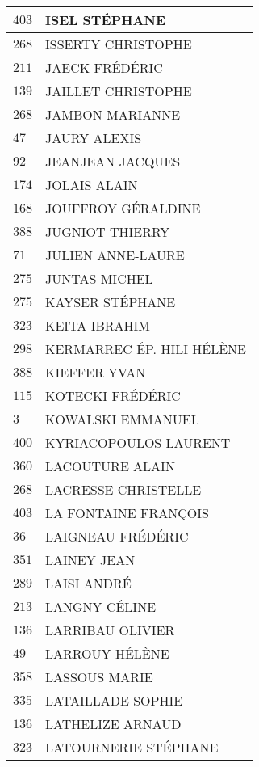 \begin{xltabular}{\linewidth}{|l|X|}
    \hline
    $403$ & ISEL STÉPHANE \\
    \hline
    $268$ & ISSERTY CHRISTOPHE \\
    \hline
    $211$ & JAECK FRÉDÉRIC \\
    \hline
    $139$ & JAILLET CHRISTOPHE \\
    \hline
    $268$ & JAMBON MARIANNE \\
    \hline
    $47$ & JAURY ALEXIS \\
    \hline
    $92$ & JEANJEAN JACQUES \\
    \hline
    $174$ & JOLAIS ALAIN \\
    \hline
    $168$ & JOUFFROY GÉRALDINE \\
    \hline
    $388$ & JUGNIOT THIERRY \\
    \hline
    $71$ & JULIEN ANNE-LAURE \\
    \hline
    $275$ & JUNTAS MICHEL \\
    \hline
    $275$ & KAYSER STÉPHANE \\
    \hline
    $323$ & KEITA IBRAHIM \\
    \hline
    $298$ & KERMARREC ÉP. HILI HÉLÈNE \\
    \hline
    $388$ & KIEFFER YVAN \\
    \hline
    $115$ & KOTECKI FRÉDÉRIC \\
    \hline
    $3$ & KOWALSKI EMMANUEL \\
    \hline
    $400$ & KYRIACOPOULOS LAURENT \\
    \hline
    $360$ & LACOUTURE ALAIN \\
    \hline
    $268$ & LACRESSE CHRISTELLE \\
    \hline
    $403$ & LA FONTAINE FRANÇOIS \\
    \hline
    $36$ & LAIGNEAU FRÉDÉRIC \\
    \hline
    $351$ & LAINEY JEAN \\
    \hline
    $289$ & LAISI ANDRÉ \\
    \hline
    $213$ & LANGNY CÉLINE \\
    \hline
    $136$ & LARRIBAU OLIVIER \\
    \hline
    $49$ & LARROUY HÉLÈNE \\
    \hline
    $358$ & LASSOUS MARIE \\
    \hline
    $335$ & LATAILLADE SOPHIE \\
    \hline
    $136$ & LATHELIZE ARNAUD \\
    \hline
    $323$ & LATOURNERIE STÉPHANE \\

\end{xltabular}
